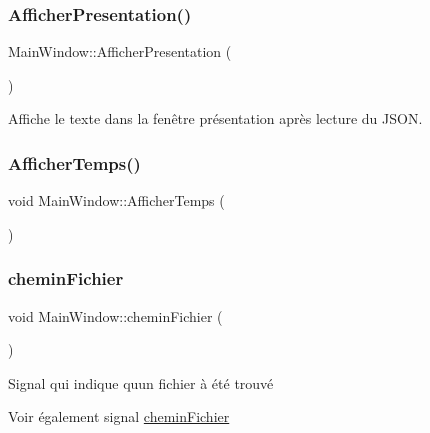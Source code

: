 \subsubsection{\texorpdfstring{Afficher\+Presentation()}{AfficherPresentation()}}
{\footnotesize\ttfamily Main\+Window\+::\+Afficher\+Presentation (\begin{DoxyParamCaption}{ }\end{DoxyParamCaption})}



Affiche le texte dans la fenêtre présentation après lecture du J\+S\+ON. 

\mbox{\label{class_main_window_a33811a52abf8f1ce71ec4e150d9c9ac8}} 
\subsubsection{\texorpdfstring{Afficher\+Temps()}{AfficherTemps()}}
{\footnotesize\ttfamily void Main\+Window\+::\+Afficher\+Temps (\begin{DoxyParamCaption}{ }\end{DoxyParamCaption})}

\mbox{\label{class_main_window_a397116dafcb548fec351091cc025b822}} 
\subsubsection{\texorpdfstring{chemin\+Fichier}{cheminFichier}}
{\footnotesize\ttfamily void Main\+Window\+::chemin\+Fichier (\begin{DoxyParamCaption}\item[{Q\+String}]{ }\end{DoxyParamCaption})\hspace{0.3cm}{\ttfamily [signal]}}



Signal qui indique qu\textquotesingle{}un fichier à été trouvé 

\begin{DoxySeeAlso}{Voir également}
signal \hyperlink{class_main_window_a397116dafcb548fec351091cc025b822}{chemin\+Fichier} 
\end{DoxySeeAlso}

